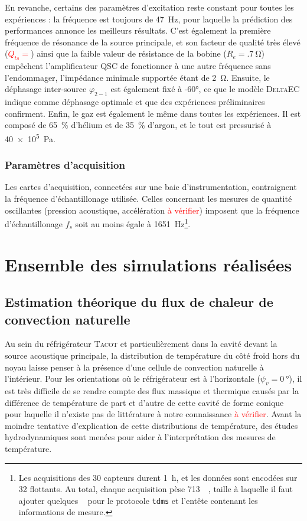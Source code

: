 En revanche, certains des paramètres d'excitation reste constant pour toutes les expériences : la fréquence est toujours de \qty{47}{\hertz}, pour laquelle la prédiction des performances annonce les meilleurs résultats. C'est également la première fréquence de résonance de la source principale, et son facteur de qualité très élevé (\textcolor{red}{$Q_{ts}=$}) ainsi que la faible valeur de résistance de la bobine ($R_e=\qty{.7}{\ohm}$) empêchent l'amplificateur QSC de fonctionner à une autre fréquence sans l'endommager, l'impédance minimale supportée étant de \qty{2}{\ohm}. Ensuite, le déphasage inter-source $\varphi_{2-1}$ est également fixé à \ang{-60}, ce que le modèle \textsc{DeltaEC} indique comme déphasage optimale et que des expériences préliminaires confirment. Enfin, le gaz est également le même dans toutes les expériences. Il est composé de \qty{65}{\percent} d'hélium et de \qty{35}{\percent} d'argon, et le tout est pressurisé à \qty{40e5}{\pascal}.



\subsubsection{Paramètres d'acquisition}

Les cartes d'acquisition, connectées sur une baie d'instrumentation, contraignent la fréquence d'échantillonage utilisée. Celles concernant les mesures de quantité oscillantes (pression acoustique, accélération \textcolor{red}{à vérifier}) imposent que la fréquence d'échantillonage $f_s$ soit au moins égale à \qty{1651}{\Hz}\footnote{Les acquisitions des \num{30} capteurs durent \qty{1}{\hour}, et les données sont encodées sur \qty{32}{\bit} flottants. Au total, chaque acquisition pèse \qty{713}{\mega\byte}, taille à laquelle il faut ajouter quelques \unit{\mega\byte} pour le protocole \texttt{tdms} et l'entête contenant les informations de mesure.}.

\section{Ensemble des simulations réalisées}\label{chap:SimusRealisees}
\subsection{Estimation théorique du flux de chaleur de convection naturelle}
Au sein du réfrigérateur \textsc{Tacot} et particulièrement dans la cavité devant la source acoustique principale, la distribution de température du côté froid hors du noyau laisse penser à la présence d'une cellule de convection naturelle à l'intérieur. Pour les orientations où le réfrigérateur est à l'horizontale ($\psi_v=\qty{0}{\degree}$), il est très difficile de se rendre compte des flux massique et thermique causés par la différence de température de part et d'autre de cette cavité de forme conique pour laquelle il n'existe pas de littérature à notre connaissance \textcolor{red}{à vérifier}. Avant la moindre tentative d'explication de cette distributions de température, des études hydrodynamiques sont menées pour aider à l'interprétation des mesures de température. 

